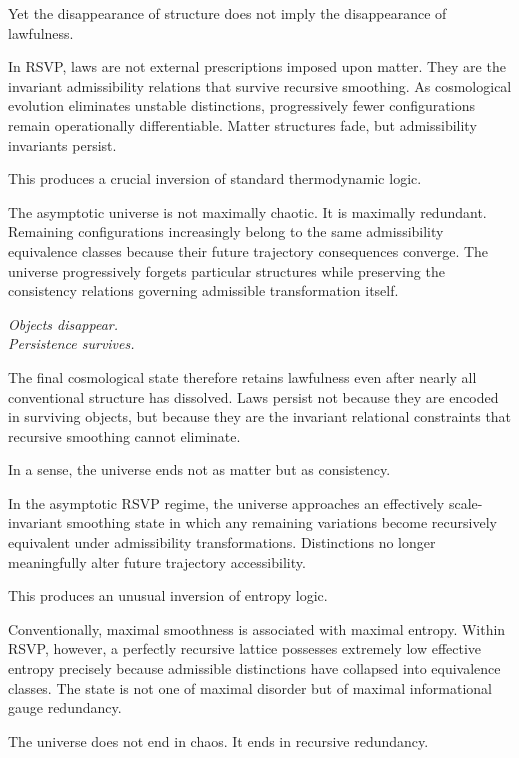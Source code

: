 \documentclass[12pt, a4paper]{article}
\begin{document}
Yet the disappearance of structure does not imply the disappearance of
lawfulness.

In RSVP, laws are not external prescriptions imposed upon matter. They are
the invariant admissibility relations that survive recursive smoothing.
As cosmological evolution eliminates unstable distinctions, progressively
fewer configurations remain operationally differentiable. Matter structures
fade, but admissibility invariants persist.

This produces a crucial inversion of standard thermodynamic logic.

The asymptotic universe is not maximally chaotic. It is maximally redundant.
Remaining configurations increasingly belong to the same admissibility
equivalence classes because their future trajectory consequences converge.
The universe progressively forgets particular structures while preserving
the consistency relations governing admissible transformation itself.

\begin{center}
\itshape
Objects disappear.\\
Persistence survives.
\end{center}

The final cosmological state therefore retains lawfulness even after nearly
all conventional structure has dissolved. Laws persist not because they are
encoded in surviving objects, but because they are the invariant relational
constraints that recursive smoothing cannot eliminate.

In a sense, the universe ends not as matter but as consistency.



In the asymptotic RSVP regime, the universe approaches an effectively
scale-invariant smoothing state in which any remaining variations become
recursively equivalent under admissibility transformations. Distinctions no
longer meaningfully alter future trajectory accessibility.

This produces an unusual inversion of entropy logic.

Conventionally, maximal smoothness is associated with maximal entropy. Within
RSVP, however, a perfectly recursive lattice possesses extremely low effective
entropy precisely because admissible distinctions have collapsed into
equivalence classes. The state is not one of maximal disorder but of maximal
informational gauge redundancy.

The universe does not end in chaos. It ends in recursive redundancy.
\end{document}
